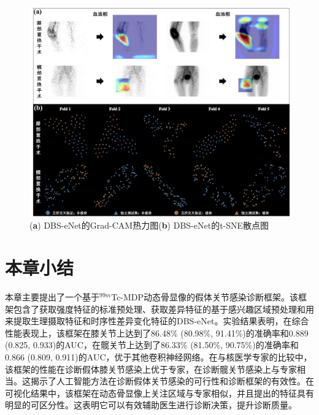 \begin{figure}[htbp]
  \centering
  \includegraphics[width=\textwidth]{figures/chap03_Grad-CAM_t-SNE.jpg}
  \caption{(\textbf{a}) DBS-eNet的Grad-CAM热力图\quad(\textbf{b}) DBS-eNet的t-SNE散点图}
  \label{fig:chap03_Grad-CAM_t-SNE}
\end{figure}

\section{本章小结}

本章主要提出了一个基于\(^{99m}\)Tc-MDP动态骨显像的假体关节感染诊断框架。该框架包含了获取强度特征的标准预处理、获取差异特征的基于感兴趣区域预处理和用来提取生理摄取特征和时序性差异变化特征的DBS-eNet。实验结果表明，在综合性能表现上，该框架在膝关节上达到了86.48\% (80.98\%, 91.41\%)的准确率和0.889 (0.825, 0.933)的AUC，在髋关节上达到了86.33\% (81.50\%, 90.75\%)的准确率和0.866 (0.809, 0.911)的AUC，优于其他卷积神经网络。在与核医学专家的比较中，该框架的性能在诊断假体膝关节感染上优于专家，在诊断髋关节感染上与专家相当。这揭示了人工智能方法在诊断假体关节感染的可行性和诊断框架的有效性。在可视化结果中，该框架在动态骨显像上关注区域与专家相似，并且提出的特征具有明显的可区分性。这表明它可以有效辅助医生进行诊断决策，提升诊断质量。